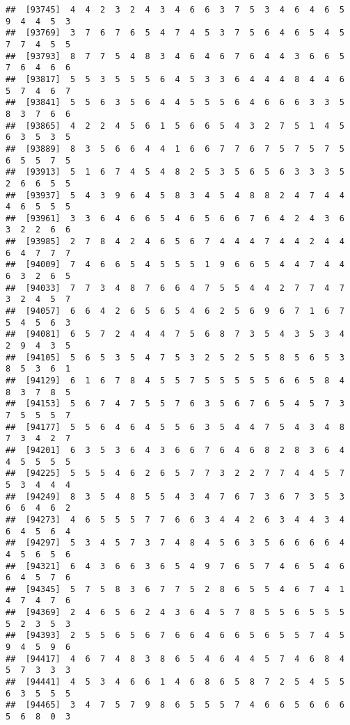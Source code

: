 \documentclass[
]{book}
\begin{document}
\begin{verbatim}
##  [93745]  4  4  2  3  2  4  3  4  6  6  3  7  5  3  4  6  4  6  5  9  4  4  5  3
##  [93769]  3  7  6  7  6  5  4  7  4  5  3  7  5  6  4  6  5  4  5  7  7  4  5  5
##  [93793]  8  7  7  5  4  8  3  4  6  4  6  7  6  4  4  3  6  6  5  7  6  4  6  6
##  [93817]  5  5  3  5  5  5  6  4  5  3  3  6  4  4  4  8  4  4  6  5  7  4  6  7
##  [93841]  5  5  6  3  5  6  4  4  5  5  5  6  4  6  6  6  3  3  5  8  3  7  6  6
##  [93865]  4  2  2  4  5  6  1  5  6  6  5  4  3  2  7  5  1  4  5  6  3  5  3  5
##  [93889]  8  3  5  6  6  4  4  1  6  6  7  7  6  7  5  7  5  7  5  6  5  5  7  5
##  [93913]  5  1  6  7  4  5  4  8  2  5  3  5  6  5  6  3  3  3  5  2  6  6  5  5
##  [93937]  5  4  3  9  6  4  5  8  3  4  5  4  8  8  2  4  7  4  4  4  6  5  5  5
##  [93961]  3  3  6  4  6  6  5  4  6  5  6  6  7  6  4  2  4  3  6  3  2  2  6  6
##  [93985]  2  7  8  4  2  4  6  5  6  7  4  4  4  7  4  4  2  4  4  6  4  7  7  7
##  [94009]  7  4  6  6  5  4  5  5  5  1  9  6  6  5  4  4  7  4  4  6  3  2  6  5
##  [94033]  7  7  3  4  8  7  6  6  4  7  5  5  4  4  2  7  7  4  7  3  2  4  5  7
##  [94057]  6  6  4  2  6  5  6  5  4  6  2  5  6  9  6  7  1  6  7  5  4  5  6  3
##  [94081]  6  5  7  2  4  4  4  7  5  6  8  7  3  5  4  3  5  3  4  2  9  4  3  5
##  [94105]  5  6  5  3  5  4  7  5  3  2  5  2  5  5  8  5  6  5  3  8  5  3  6  1
##  [94129]  6  1  6  7  8  4  5  5  7  5  5  5  5  5  6  6  5  8  4  8  3  7  8  5
##  [94153]  5  6  7  4  7  5  5  7  6  3  5  6  7  6  5  4  5  7  3  7  5  5  5  7
##  [94177]  5  5  6  4  6  4  5  5  6  3  5  4  4  7  5  4  3  4  8  7  3  4  2  7
##  [94201]  6  3  5  3  6  4  3  6  6  7  6  4  6  8  2  8  3  6  4  4  5  5  5  5
##  [94225]  5  5  5  4  6  2  6  5  7  7  3  2  2  7  7  4  4  5  7  5  3  4  4  4
##  [94249]  8  3  5  4  8  5  5  4  3  4  7  6  7  3  6  7  3  5  3  6  6  4  6  2
##  [94273]  4  6  5  5  5  7  7  6  6  3  4  4  2  6  3  4  4  3  4  6  4  5  6  4
##  [94297]  5  3  4  5  7  3  7  4  8  4  5  6  3  5  6  6  6  6  4  4  5  6  5  6
##  [94321]  6  4  3  6  6  3  6  5  4  9  7  6  5  7  4  6  5  4  6  6  4  5  7  6
##  [94345]  5  7  5  8  3  6  7  7  5  2  8  6  5  5  4  6  7  4  1  4  7  4  7  6
##  [94369]  2  4  6  5  6  2  4  3  6  4  5  7  8  5  5  6  5  5  5  5  2  3  5  3
##  [94393]  2  5  5  6  5  6  7  6  6  4  6  6  5  6  5  5  7  4  5  9  4  5  9  6
##  [94417]  4  6  7  4  8  3  8  6  5  4  6  4  4  5  7  4  6  8  4  5  7  3  3  3
##  [94441]  4  5  3  4  6  6  1  4  6  8  6  5  8  7  2  5  4  5  5  6  3  5  5  5
##  [94465]  3  4  7  5  7  9  8  6  5  5  5  7  4  6  6  5  6  6  6  5  6  8  0  3

\end{verbatim}
\end{document}

